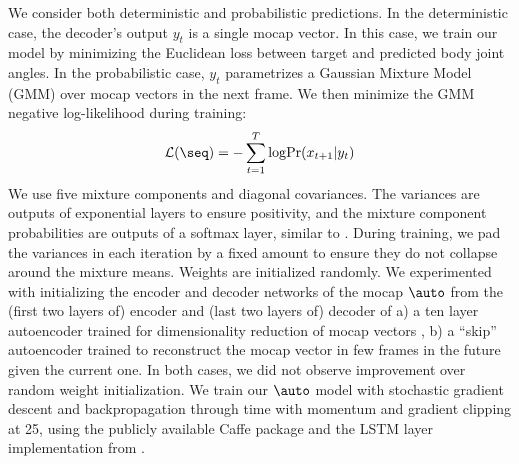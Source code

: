 \documentclass[10pt,twocolumn,letterpaper]{article}
\begin{document}
We consider both deterministic and probabilistic predictions. In the deterministic case, the decoder's output $y_t$ is a single mocap vector.  In this case, we train our model by minimizing the Euclidean loss between target and predicted body joint angles. In the probabilistic case, $y_t$  parametrizes  a Gaussian Mixture Model (GMM) over mocap vectors in the next frame.  We then  minimize the GMM negative log-likelihood during training:
\begin{equation}
 \mathcal{L}(\seq) = - \displaystyle\sum_{t=1}^T\mathrm{log}\mathrm{Pr}(x_{t+1}|y_t)
\end{equation}
We use five mixture components and diagonal covariances. The variances are outputs of  exponential layers to ensure  positivity, and the mixture component probabilities are outputs of a softmax layer, similar to \cite{DBLP:journals/corr/Graves13}. During training, we  pad the variances in each iteration by a fixed amount to ensure they do not collapse around the mixture means.
   Weights are initialized randomly. We experimented with initializing the encoder and decoder networks of the mocap $\auto$ from the (first two layers of) encoder and (last two layers of) decoder of a) a ten layer autoencoder trained for dimensionality reduction of mocap  vectors \cite{citeulike:778023}, 
  b) a ``skip'' autoencoder  trained to reconstruct the  mocap vector in few frames in the future given the current one. In both cases, we did not observe improvement over random weight initialization.  We train our $\auto$ model with stochastic gradient descent and backpropagation through time \cite{Williams95gradient-basedlearning} with momentum and gradient clipping at 25, using the publicly available Caffe package \cite{Jia13caffe} and the LSTM layer  implementation from \cite{DBLP:journals/corr/DonahueHGRVSD14}. 
  
\end{document}
